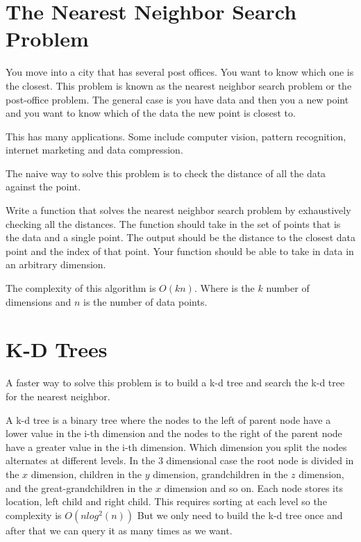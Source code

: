 \label{Ch:NNS}


\section*{The Nearest Neighbor Search Problem}

You move into a city that has several post offices. You want to know which one is the closest. This problem is  known as the nearest neighbor search problem or the post-office problem. The general case is you have data and then you a new point and you want to know which of the data the new point is closest to.

This has many applications. Some include computer vision, pattern recognition, internet marketing and data compression.

The naive way to solve this problem is to check the distance of all the data against the point.

\begin{problem}
Write a function that solves the nearest neighbor search problem by exhaustively checking all the distances. The function should take in the set of points that is the data and a single point. The output should be the distance to the closest data point and the index of that point. Your function should be able to take in data in an arbitrary dimension.
\end{problem}

The complexity of this algorithm is $O(kn)$. Where  is the $k$ number of dimensions and $n$ is the number of data points.

\section*{K-D Trees}

A faster way to solve this problem is to build a k-d tree and search the k-d tree for the nearest neighbor. 

A k-d tree is a binary tree where the nodes to the left of parent node have a lower value in the i-th dimension and the nodes to the right of the parent node have a greater value in the i-th dimension. Which dimension you split the nodes alternates at different levels. In the $3$ dimensional case the root node is divided in the $x$ dimension, children in the $y$ dimension, grandchildren in the $z$ dimension, and the great-grandchildren in the $x$ dimension and so on. Each node stores its location, left child and right child. This requires sorting at each level so the complexity is $O(nlog^2(n))$ But we only need to build the k-d tree once and after that we can query it as many times as we want.

